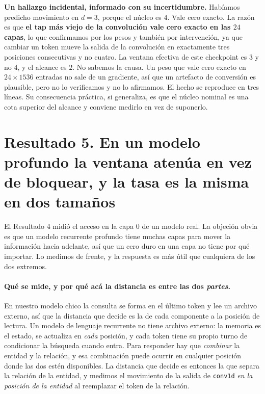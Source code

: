 \documentclass[11pt,a4paper]{article}
\begin{document}
\textbf{Un hallazgo incidental, informado con su incertidumbre.} Habíamos predicho movimiento en
$d=3$, porque el núcleo es $4$. Vale cero exacto. La razón es que \textbf{el tap más viejo de la
convolución vale cero exacto en las $24$ capas}, lo que confirmamos por los pesos y también por
intervención, ya que cambiar un token mueve la salida de la convolución en exactamente tres posiciones
consecutivas y no cuatro. La ventana efectiva de este checkpoint es $3$ y no $4$, y el alcance es $2$.
No sabemos la causa. Un peso que vale cero exacto en $24 \times 1536$ entradas no sale de un
gradiente, así que un artefacto de conversión es plausible, pero no lo verificamos y no lo afirmamos.
El hecho se reproduce en tres líneas. Su consecuencia práctica, si generaliza, es que el núcleo
nominal es una cota superior del alcance y conviene medirlo en vez de suponerlo.

\section{Resultado 5. En un modelo profundo la ventana atenúa en vez de bloquear, y la tasa es la misma en dos tamaños}

El Resultado 4 midió el acceso en la capa $0$ de un modelo real. La objeción obvia es que un modelo
recurrente profundo tiene muchas capas para mover la información hacia adelante, así que un cero duro
en una capa no tiene por qué importar. Lo medimos de frente, y la respuesta es más útil que cualquiera
de los dos extremos.

\paragraph{Qué se mide, y por qué acá la distancia es entre las dos \emph{partes}.} En nuestro modelo
chico la consulta se forma en el último token y lee un archivo externo, así que la distancia que
decide es la de cada componente a la posición de lectura. Un modelo de lenguaje recurrente no tiene
archivo externo: la memoria es el estado, se actualiza en \emph{cada} posición, y cada token tiene su
propio turno de condicionar la búsqueda cuando entra. Para responder hay que \emph{combinar} la
entidad y la relación, y esa combinación puede ocurrir en cualquier posición donde las dos estén
disponibles. La distancia que decide es entonces la que separa la relación de la entidad, y medimos
el movimiento de la salida de \texttt{conv1d} \emph{en la posición de la entidad} al reemplazar el
token de la relación.
\end{document}
